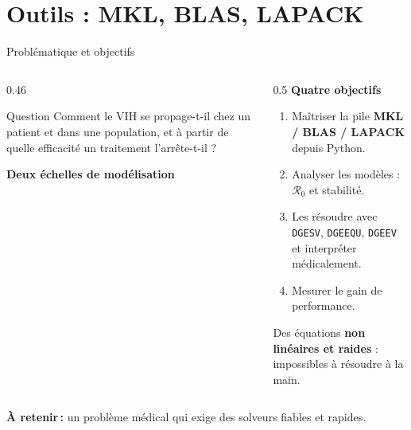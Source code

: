\documentclass[aspectratio=169,11pt,t]{beamer}
\newcommand{\Rzero}{\mathcal{R}_0}
\newcommand{\takeaway}[1]{\vfill\noindent{\color{gold}\vrule width 3pt}\colorbox{lightbg}{\parbox[c]{\dimexpr\textwidth-3pt-2\fboxsep\relax}{\vphantom{Ég}\small\textbf{\color{navy}À retenir\,:} #1\vphantom{Ég}}}\par}
\begin{document}
\section{Outils : MKL, BLAS, LAPACK}

\begin{frame}{Problématique et objectifs}
    \begin{columns}[T,onlytextwidth]
        \begin{column}{0.46\textwidth}
            \begin{block}{Question}
                Comment le VIH se propage-t-il chez un patient et dans une population, et à partir de quelle efficacité un traitement l'arrête-t-il ?
            \end{block}
            \vspace{0.2cm}
            \textbf{Deux échelles de modélisation}
            \medskip

        \end{column}
        \begin{column}{0.5\textwidth}
            \textbf{Quatre objectifs}
            \medskip
            \begin{enumerate}
                \item Maîtriser la pile \textbf{MKL / BLAS / LAPACK} depuis Python.
                \item Analyser les modèles : $\Rzero$ et stabilité.
                \item Les résoudre avec \texttt{DGESV}, \texttt{DGEEQU}, \texttt{DGEEV} et interpréter médicalement.
                \item Mesurer le gain de performance.
            \end{enumerate}
            \vspace{0.2cm}
            Des équations \textbf{non linéaires et raides} : impossibles à résoudre à la main.
        \end{column}
    \end{columns}
    \takeaway{un problème médical qui exige des solveurs fiables et rapides.}
\end{frame}
\end{document}
